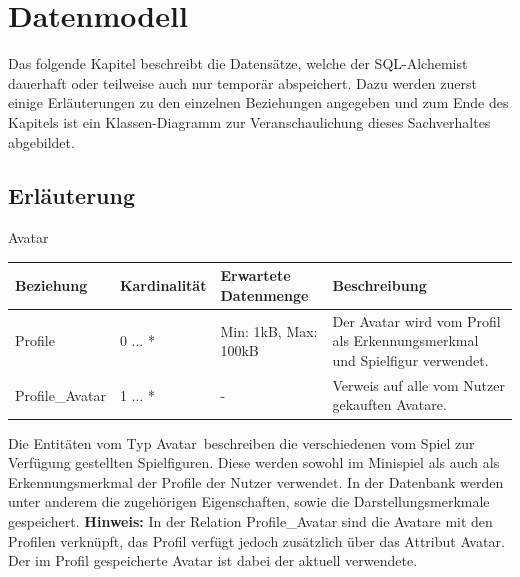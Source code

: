 
\chapter{Datenmodell}

Das folgende Kapitel beschreibt die Datensätze, welche der SQL-Alchemist dauerhaft oder teilweise auch nur temporär abspeichert.
Dazu werden zuerst einige Erl\"auterungen zu den einzelnen Beziehungen angegeben und zum Ende des Kapitels ist ein Klassen-Diagramm zur Veranschaulichung dieses Sachverhaltes abgebildet.


\section{Erläuterung}


\begin{entity}{10}{Avatar}
\begin{center}
	\begin{longtable}{|m{4cm}|m{}|m{}|m{}|}
 	 \hline
 	 \textbf{Beziehung} & \textbf{Kardinalität} &  \textbf{Erwartete Datenmenge} & \textbf{Beschreibung} \\
  	\hline
  	Profile & 0 ... *   & Min: 1kB, Max: 100kB & Der Avatar wird vom Profil als Erkennungsmerkmal und Spielfigur verwendet.\\
  	  	\hline
  	Profile\_Avatar & 1 ... *   & - & Verweis auf alle vom Nutzer gekauften Avatare.\\
	  \hline
	\end{longtable}
\end{center}
Die Entitäten vom Typ \glqq Avatar\grqq~beschreiben die verschiedenen vom Spiel zur Verfügung gestellten Spielfiguren. Diese werden sowohl im Minispiel als auch als Erkennungsmerkmal der Profile der Nutzer verwendet.
In der Datenbank werden unter anderem die zugehörigen Eigenschaften, sowie die Darstellungsmerkmale gespeichert.
\textbf{Hinweis:} In der Relation Profile\_Avatar sind die Avatare mit den Profilen verknüpft, das Profil verfügt jedoch zusätzlich über das Attribut \glqq Avatar\grqq. Der im Profil gespeicherte Avatar ist dabei der aktuell verwendete.
\end{entity}



